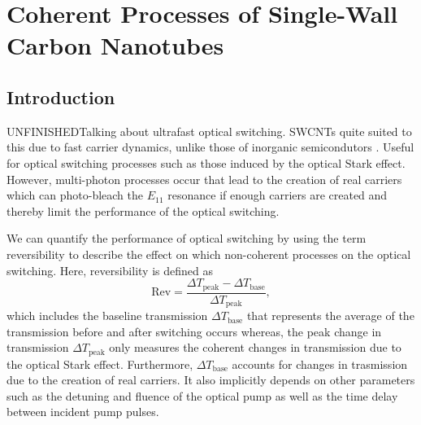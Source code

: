 \chapter{Coherent Processes of Single-Wall Carbon Nanotubes}

\section{Introduction}


{\color{red} UNFINISHED}Talking about ultrafast optical switching. SWCNTs quite suited to this due to fast carrier dynamics, unlike those of inorganic semicondutors \cite{maeda2006gigantic}. Useful for optical switching processes such as those induced by the optical Stark effect. However, multi-photon processes occur that lead to the creation of real carriers which can photo-bleach the $E_{11}$ resonance if enough carriers are created and thereby limit the performance of the optical switching.

We can quantify the performance of optical switching by using the term reversibility to describe the effect on which non-coherent processes on the optical switching. Here, reversibility is defined as
%
\begin{equation}
 	\text{Rev} = \dfrac{\Delta T_\text{peak} - \Delta T_\text{base}}{\Delta T_\text{peak}},
\end{equation}
%
which includes the baseline transmission $\Delta T_\text{base}$ that represents the average of the transmission before and after switching occurs whereas, the peak change in transmission $\Delta T_\text{peak}$ only measures the coherent changes in transmission due to the optical Stark effect. Furthermore, $\Delta T_\text{base}$ accounts for changes in trasmission due to the creation of real carriers. It also implicitly depends on other parameters such as the detuning and fluence of the optical pump as well as the time delay between incident pump pulses.

